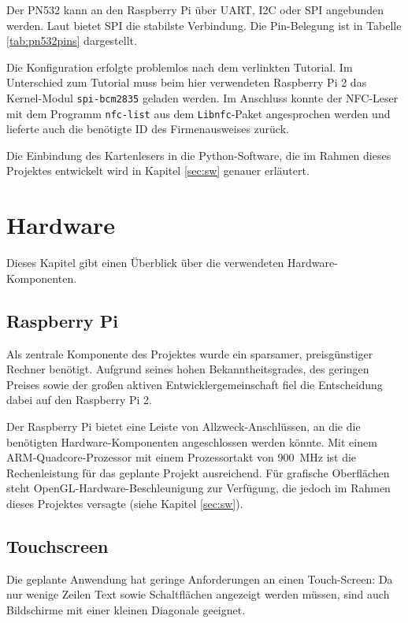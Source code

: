 \documentclass[11pt,a4paper]{IEEEtran}
\begin{document}
Der PN532 kann an den Raspberry Pi über UART, I2C oder SPI angebunden werden.
Laut \autocite{PN532Tutorial} bietet SPI die stabilste Verbindung. Die 
Pin-Belegung ist in Tabelle \ref{tab:pn532pins} dargestellt.

Die Konfiguration erfolgte problemlos nach dem verlinkten Tutorial. Im
Unterschied zum Tutorial muss beim hier verwendeten Raspberry Pi 2 das
Kernel-Modul \texttt{spi-bcm2835} geladen werden. Im Anschluss konnte der
NFC-Leser mit dem Programm \texttt{nfc-list} aus dem \texttt{Libnfc}-Paket
angesprochen werden und lieferte auch die benötigte ID des Firmenausweises
zurück.

Die Einbindung des Kartenlesers in die Python-Software, die im Rahmen dieses 
Projektes entwickelt wird in Kapitel \ref{sec:sw} genauer erläutert.

\section{Hardware} \label{sec:hw}

Dieses Kapitel gibt einen Überblick über die verwendeten Hardware-Komponenten.

\subsection{Raspberry Pi}

Als zentrale Komponente des Projektes wurde ein sparsamer, preisgünstiger
Rechner benötigt. Aufgrund seines hohen Bekanntheitsgrades, des geringen Preises 
sowie der großen aktiven Entwicklergemeinschaft fiel die Entscheidung dabei
auf den Raspberry Pi 2. 

Der Raspberry Pi bietet eine Leiste von Allzweck-Anschlüssen, an die die
benötigten Hardware-Komponenten angeschlossen werden könnte. Mit einem
ARM-Quadcore-Prozessor mit einem Prozessortakt von \SI{900}{\mega\hertz} ist
die Rechenleistung für das geplante Projekt ausreichend. Für grafische
Oberflächen steht OpenGL-Hardware-Beschleunigung zur Verfügung, die jedoch im 
Rahmen dieses Projektes versagte (siehe Kapitel \ref{sec:sw}).

\subsection{Touchscreen}

Die geplante Anwendung hat geringe Anforderungen an einen Touch-Screen: Da nur
wenige Zeilen Text sowie Schaltflächen angezeigt werden müssen, sind auch
Bildschirme mit einer kleinen Diagonale geeignet.
\end{document}
